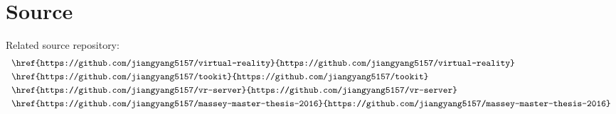 \chapter{Source}
\label{appendix-source}

Related source repository:
\[
\begin{array}{lr}
\begin{aligned}
&\code{\href{https://github.com/jiangyang5157/virtual-reality}{https://github.com/jiangyang5157/virtual-reality}}\\
&\code{\href{https://github.com/jiangyang5157/tookit}{https://github.com/jiangyang5157/tookit}}\\
&\code{\href{https://github.com/jiangyang5157/vr-server}{https://github.com/jiangyang5157/vr-server}}\\
&\code{\href{https://github.com/jiangyang5157/massey-master-thesis-2016}{https://github.com/jiangyang5157/massey-master-thesis-2016}}\\
\end{aligned}
\end{array}
\]

